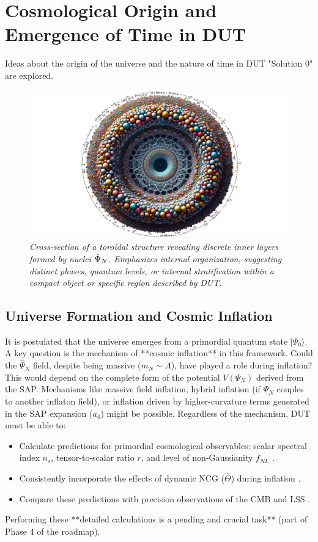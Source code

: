 \documentclass[11pt, a4paper]{article}
\theoremstyle{remark}
\newcommand{\Op}[1]{\hat{#1}}
\begin{document}
\section{Cosmological Origin and Emergence of Time in DUT}
\label{sec:cosmo_origin_final}

Ideas about the origin of the universe and the nature of time in DUT "Solution 0" are explored.

\begin{figure}[htbp]
    \centering
    \includegraphics[width=0.6\linewidth]{OIG2.ZNLJ.PNG}
    \caption{%
        \footnotesize\textit{Cross-section of a toroidal structure revealing discrete inner layers formed by nuclei \(\protect\Op{\Psi}_N\). Emphasizes internal organization, suggesting distinct phases, quantum levels, or internal stratification within a compact object or specific region described by DUT.}
    }
    \label{fig:Figura11}
\end{figure}

\subsection{Universe Formation and Cosmic Inflation}
\label{subsec:universe_formation_inflation_final_revised}
It is postulated that the universe emerges from a primordial quantum state \(|\Psi_0\rangle\). A key question is the mechanism of **cosmic inflation** \citep{Guth:1980zm, Linde:1981mu, Albrecht:1982wi, Starobinsky1980} in this framework. Could the \( \Op{\Psi}_N \) field, despite being massive (\( m_N \sim \Lambda \)), have played a role during inflation? This would depend on the complete form of the potential \( V(\Psi_N) \) derived from the SAP. Mechanisms like massive field inflation, hybrid inflation (if \( \Psi_N \) couples to another inflaton field), or inflation driven by higher-curvature terms generated in the SAP expansion (\( a_4 \)) might be possible.
Regardless of the mechanism, DUT must be able to:
\begin{itemize}
    \item Calculate predictions for primordial cosmological observables: scalar spectral index \( n_s \), tensor-to-scalar ratio \( r \), and level of non-Gaussianity \( f_{NL} \) \citep{Maldacena2003NonGaussian}.
    \item Consistently incorporate the effects of dynamic NCG (\( \Op{\Theta} \)) during inflation \citep[cf.][]{Aschieri2022}.
    \item Compare these predictions with precision observations of the CMB and LSS \citep{Planck2018Inflation, Planck2018NonGaussianity, BICEP:2021xfz}.
\end{itemize}
Performing these **detailed calculations is a pending and crucial task** (part of Phase 4 of the roadmap).
\end{document}
